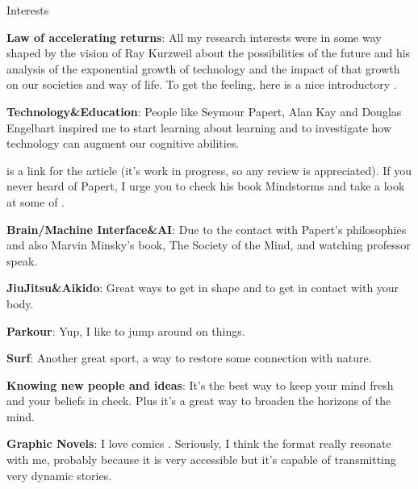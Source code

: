 \begin{rubric}{Interests}{
    \entry* \textbf{Law of accelerating returns}: All my research interests were
    in some way shaped by the vision of Ray Kurzweil about the possibilities of
    the future and his analysis of the exponential growth of technology and the
    impact of that growth on our societies and way of life. To get the feeling,
    here is a nice introductory
    .



    \entry* \textbf{Technology\&Education}: People like 
    Seymour Papert, Alan Kay and Douglas Engelbart inspired me to
    start learning about learning and to investigate how technology can augment
    our cognitive abilities.
    
    is a link for the article (it's work in progress, so any review is
    appreciated). If you never heard of Papert, I urge you to check his book
    Mindstorms and take a look at some of
    .

    \entry* \textbf{Brain/Machine Interface\&AI}: Due to the contact with
    Papert's philosophies and also Marvin Minsky's book, The Society of the
    Mind, and watching professor 
    speak.

    \entry* \textbf{JiuJitsu\&Aikido}: Great ways to get in shape and to get in
        contact with your body.

    \entry* \textbf{Parkour}: Yup, I like to jump around on things.

    \entry* \textbf{Surf}: Another great sport, a way to restore some connection
    with nature.

    \entry* \textbf{Knowing new people and ideas}: It's the best way to keep
    your mind fresh and your beliefs in check. Plus it's a great way to broaden
    the horizons of the mind.

    \entry* \textbf{Graphic Novels}: I love comics \smiley. Seriously, I think
    the format really resonate with me, probably because it is very accessible
    but it's capable of transmitting very dynamic stories.

}\end{rubric}

